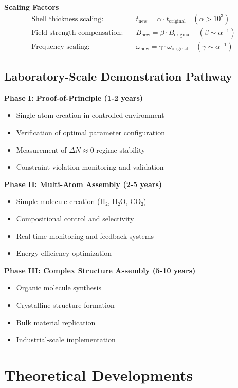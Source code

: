 \documentclass[11pt]{article}
\begin{document}
\textbf{Scaling Factors}
\begin{align}
\text{Shell thickness scaling:} &\quad t_{\text{new}} = \alpha \cdot t_{\text{original}} \quad (\alpha > 10^{3}) \\
\text{Field strength compensation:} &\quad B_{\text{new}} = \beta \cdot B_{\text{original}} \quad (\beta \sim \alpha^{-1}) \\
\text{Frequency scaling:} &\quad \omega_{\text{new}} = \gamma \cdot \omega_{\text{original}} \quad (\gamma \sim \alpha^{-1})
\end{align}

\subsection{Laboratory-Scale Demonstration Pathway}

\textbf{Phase I: Proof-of-Principle (1-2 years)}
\begin{itemize}
\item Single atom creation in controlled environment
\item Verification of optimal parameter configuration
\item Measurement of $\Delta N \approx 0$ regime stability
\item Constraint violation monitoring and validation
\end{itemize}

\textbf{Phase II: Multi-Atom Assembly (2-5 years)}
\begin{itemize}
\item Simple molecule creation (H₂, H₂O, CO₂)
\item Compositional control and selectivity
\item Real-time monitoring and feedback systems
\item Energy efficiency optimization
\end{itemize}

\textbf{Phase III: Complex Structure Assembly (5-10 years)}
\begin{itemize}
\item Organic molecule synthesis
\item Crystalline structure formation
\item Bulk material replication
\item Industrial-scale implementation
\end{itemize}

\section{Theoretical Developments}
\end{document}
